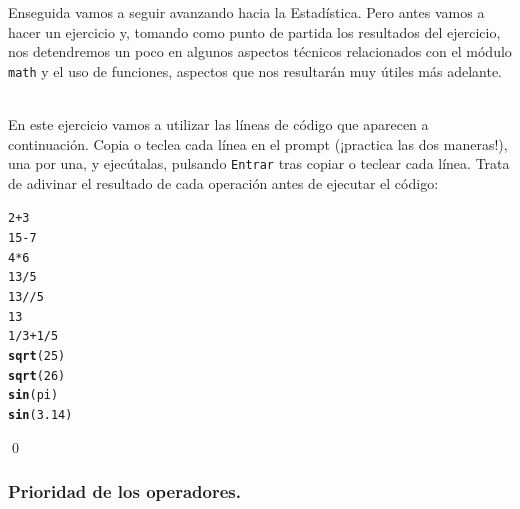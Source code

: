 \documentclass[10pt,a4paper]{article}\usepackage[]{graphicx}\usepackage[]{color}
\makeatletter
\newcommand{\hlkwd}[1]{\textcolor[rgb]{0.737,0.353,0.396}{\textbf{#1}}}%
\newenvironment{kframe}{%
 \def\at@end@of@kframe{}%
 \ifinner\ifhmode%
  \def\at@end@of@kframe{\end{minipage}}%
  \begin{minipage}{\columnwidth}%
 \fi\fi%
 \def\FrameCommand##1{\hskip\@totalleftmargin \hskip-\fboxsep
 \colorbox{shadecolor}{##1}\hskip-\fboxsep
     \hskip-\linewidth \hskip-\@totalleftmargin \hskip\columnwidth}%
 \MakeFramed {\advance\hsize-\width
   \@totalleftmargin\z@ \linewidth\hsize
   \@setminipage}}%
 {\par\unskip\endMakeFramed%
 \at@end@of@kframe}
\newenvironment{knitrout}{}{} %
\newcounter {cont01}
\makeatother
\begin{document}
Enseguida vamos a seguir avanzando hacia la Estadística. Pero antes vamos a hacer un ejercicio y, tomando como punto de partida los resultados del ejercicio, nos detendremos un poco en algunos aspectos técnicos relacionados con el módulo {\tt math} y el uso de funciones, aspectos que nos resultarán muy útiles más adelante.

\begin{ejercicio}
\label{tut02:ejercicio01}
\quad\\
En este ejercicio vamos a utilizar las líneas de  código que aparecen a continuación. Copia o teclea cada línea en el prompt (¡practica las dos maneras!), una por una, y ejecútalas, pulsando {\tt Entrar} tras copiar o teclear cada línea. Trata de adivinar el resultado de cada operación antes de ejecutar el código:
\begin{knitrout}
\color{fgcolor}\begin{kframe}
\begin{alltt}
2+3
15-7
4*6
13/5
13//5
13%
1/3+1/5
\hlkwd{sqrt}(25)
\hlkwd{sqrt}(26)
\hlkwd{sin}(pi)
\hlkwd{sin}(3.14)
\end{alltt}
\end{kframe}
\end{knitrout}
\qed
\end{ejercicio}

\subsubsection*{Prioridad de los operadores.}
\end{document}
